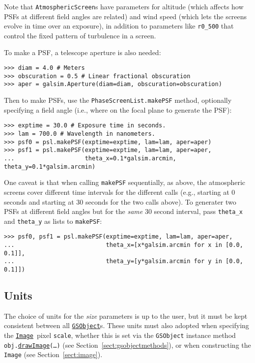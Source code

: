 \documentclass[preprint,10pt]{../../devel/modules/aastex}
\newcommand\GSObject{\href{http://galsim-developers.github.io/GalSim/classgalsim_1_1base_1_1_g_s_object.html}{\texttt{GSObject}}}
\newcommand\drawImage{\href{http://galsim-developers.github.io/GalSim/classgalsim_1_1base_1_1_g_s_object.html\#aafe6ca9d84fe81543fbc105b897273db}{\texttt{drawImage}}}
\newcommand\Image{\href{http://galsim-developers.github.io/GalSim/classgalsim_1_1image_1_1_image.html}{\texttt{Image}}}
\begin{document}
Note that \texttt{AtmosphericScreen}s have parameters for altitude (which affects how PSFs at
different field angles are related) and wind speed (which lets the screens evolve in time over an
exposure), in addition to parameters like \texttt{r0\_500} that control the fixed pattern of
turbulence in a screen.

To make a PSF, a telescope aperture is also needed:

\begin{verbatim}
>>> diam = 4.0 # Meters
>>> obscuration = 0.5 # Linear fractional obscuration
>>> aper = galsim.Aperture(diam=diam, obscuration=obscuration)
\end{verbatim}

Then to make PSFs, use the \texttt{PhaseScreenList.makePSF} method, optionally specifying a field
angle (i.e., where on the focal plane to generate the PSF):

\begin{verbatim}
>>> exptime = 30.0 # Exposure time in seconds.
>>> lam = 700.0 # Wavelength in nanometers.
>>> psf0 = psl.makePSF(exptime=exptime, lam=lam, aper=aper)
>>> psf1 = psl.makePSF(exptime=exptime, lam=lam, aper=aper,
...                    theta_x=0.1*galsim.arcmin, theta_y=0.1*galsim.arcmin)
\end{verbatim}

One caveat is that when calling \texttt{makePSF} sequentially, as above, the atmospheric screens
cover different time intervals for the different calls (e.g., starting at 0 seconds and starting at
30 seconds for the two calls above). To generater two PSFs at different field angles but for the
\textit{same} 30 second interval, pass \texttt{theta\_x} and \texttt{theta\_y} as lists to
\texttt{makePSF}:

\begin{verbatim}
>>> psf0, psf1 = psl.makePSF(exptime=exptime, lam=lam, aper=aper,
...                          theta_x=[x*galsim.arcmin for x in [0.0, 0.1]],
...                          theta_y=[y*galsim.arcmin for y in [0.0, 0.1]])
\end{verbatim}

\subsection{Units}
The choice of units for the \textit{size} parameters is up to the user,
but it must be kept consistent between all \GSObject s.  These
units must also adopted when specifying the \Image\ pixel
\texttt{scale}, whether this is set via the \texttt{GSObject}
instance method \texttt{obj.}\drawImage\texttt{(\dots)}
(see Section~\ref{sect:gsobjectmethods}),
or when constructing the \texttt{Image} (see Section~\ref{sect:image}).
\end{document}
